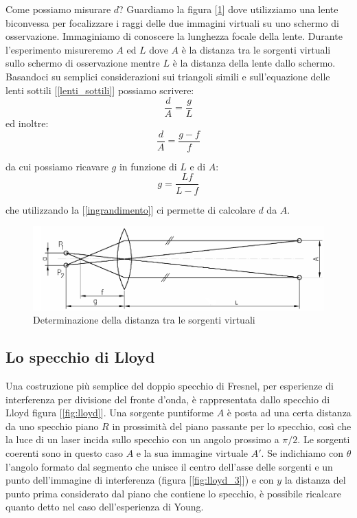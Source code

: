 \documentclass[a4paper,10pt,oneside]{article}
\begin{document}
Come possiamo misurare $d$? Guardiamo la figura [\ref{fig:fresnel_2}] dove utilizziamo una lente biconvessa per focalizzare i raggi delle due immagini virtuali su uno schermo di osservazione. Immaginiamo di conoscere la lunghezza focale della lente. Durante l'esperimento misureremo $A$ ed $L$ dove $A$ è la distanza tra le sorgenti virtuali sullo schermo di osservazione mentre $L$ è la distanza della lente dallo schermo. Basandoci su semplici considerazioni sui triangoli simili e sull'equazione delle lenti sottili [\ref{lenti_sottili}] possiamo scrivere:
\begin{equation}
 \frac{d}{A}=\frac{g}{L}
\end{equation}
ed inoltre:
\begin{equation}
 \frac{d}{A}=\frac{g-f}{f}
\end{equation}

da cui possiamo ricavare $g$ in funzione di $L$ e di $A$:
\begin{equation}
 g=\frac{Lf}{L-f}
\end{equation}

che utilizzando la [\ref{ingrandimento}] ci permette di calcolare $d$ da $A$.

\begin{figure}[H]
 \centering
 \includegraphics[width=\textwidth]{./Immagini/fresnel_mirrors.png}
 \caption{Determinazione della distanza tra le sorgenti virtuali}
 \label{fig:fresnel_2}
\end{figure}
\subsection*{Lo specchio di Lloyd}

Una costruzione più semplice del doppio specchio di Fresnel, per esperienze di interferenza per divisione del fronte d'onda, è rappresentata dallo specchio di Lloyd figura [\ref{fig:lloyd}]. Una sorgente puntiforme $A$ è posta ad una certa distanza da uno specchio piano $R$ in prossimità del piano passante per lo specchio, così che la luce di un laser incida sullo specchio con un angolo prossimo a $\pi/2$. Le sorgenti coerenti sono in questo caso $A$ e la sua immagine virtuale $A'$. Se indichiamo con $\theta$ l'angolo formato dal segmento che unisce il centro dell'asse delle sorgenti e un punto dell'immagine di interferenza (figura [\ref{fig:lloyd_3}]) e con $y$ la distanza del punto prima considerato dal piano che contiene lo specchio, è possibile ricalcare quanto detto nel caso dell'esperienza di Young.
\end{document}
